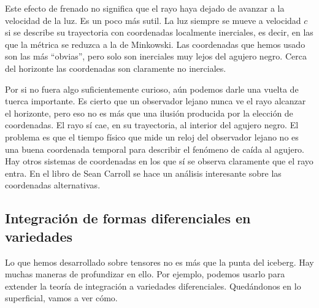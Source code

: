 \begin{example}
    Este efecto de frenado no significa que el rayo haya dejado de avanzar a la velocidad de la luz. Es un poco más sutil. La luz siempre se mueve a velocidad \(c\) si se describe su trayectoria con coordenadas localmente inerciales, es decir, en las que la métrica se reduzca a la de Minkowski. Las coordenadas que hemos usado son las más ``obvias'', pero solo son inerciales muy lejos del agujero negro. Cerca del horizonte las coordenadas son claramente no inerciales. 

    Por si no fuera algo suficientemente curioso, aún podemos darle una vuelta de tuerca importante. Es cierto que un observador lejano nunca ve el rayo alcanzar el horizonte, pero eso no es más que una ilusión producida por la elección de coordenadas. El rayo sí cae, en su trayectoria, al interior del agujero negro. El problema es que el tiempo físico que mide un reloj del observador lejano no es una buena coordenada temporal para describir el fenómeno de caída al agujero. Hay otros sistemas de coordenadas en los que sí se observa claramente que el rayo entra. En el libro de Sean Carroll se hace un análisis interesante sobre las coordenadas alternativas.
\end{example}

\subsection{Integración de formas diferenciales en variedades}
\label{subsec.3integracion}

Lo que hemos desarrollado sobre tensores no es más que la punta del iceberg. Hay muchas maneras de profundizar en ello. Por ejemplo, podemos usarlo para extender la teoría de integración a variedades diferenciales. Quedándonos en lo superficial, vamos a ver cómo. 

